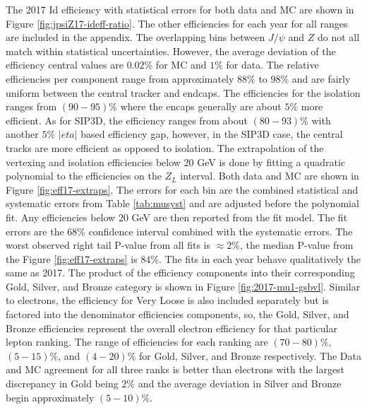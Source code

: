  The 2017 Id efficiency with statistical errors for both data and MC are shown in Figure \ref{fig:jpsiZ17-ideff-ratio}. The other efficiencies for each year for all \pt ranges are included in the appendix. The overlapping bins between $J/\psi$ and $Z$ do not all match within statistical uncertainties. However, the average deviation of the efficiency central values are $0.02\%$ for MC and $1\%$ for data.  The relative efficiencies per component range from approximately $88\%$ to $98\%$ and are fairly uniform between the central tracker and endcaps. The efficiencies for the isolation ranges from $(90 - 95)\%$ where the encaps generally are about $5\%$ more efficient. As for SIP3D, the efficiency ranges from about $(80 - 93)\%$ with another $5\%$ $|eta|$ based efficiency gap, however, in the SIP3D case, the central tracks are more efficient as opposed to isolation.  The extrapolation of the vertexing and isolation efficiencies below 20 GeV is done by fitting a quadratic polynomial to the efficiencies on the $Z_L$ interval.  Both data and MC are shown in Figure \ref{fig:eff17-extraps}.  The errors for each bin are the combined statistical and systematic errors from Table \ref{tab:musyst} and are adjusted before the polynomial fit. Any efficiencies below 20 GeV are then reported from the fit model. The fit errors are the 68\% confidence interval combined with the systematic errors. The worst observed right tail P-value from all fits is $\approx 2\%$, the median P-value from the Figure \ref{fig:eff17-extraps} is $84\%$. The fits in each year behave qualitatively the same as 2017.
The product of the efficiency components into their corresponding Gold, Silver, and Bronze category is shown in Figure \ref{fig:2017-mu1-gsbvl}. Similar to electrons, the efficiency for Very Loose is also included separately but is factored into the denominator efficiencies components, so, the Gold, Silver, and Bronze
efficiencies represent the overall electron efficiency for that particular lepton ranking. The
range of efficiencies for each ranking are $(70 - 80)\%$, $(5 - 15)\%$, and $(4 - 20)\%$ for Gold, Silver, and Bronze respectively. The Data and MC agreement for all three ranks is better than electrons with the largest discrepancy in Gold being $2\%$ and the average deviation in Silver and Bronze begin approximately $(5-10)\%$.




